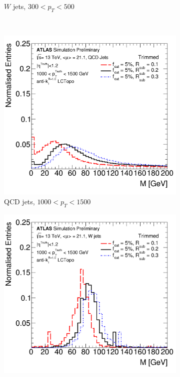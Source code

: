 \begin{figure}[htbp!]
\begin{subfigure}[b]{0.4\textwidth}
        \caption{$W$ jets, $300 < p_{T} < 500$ \GeV}
        \label{fig:obj_trim_w_lowpt}
    \end{subfigure} \\ 
    \begin{subfigure}[b]{0.4\textwidth}
        \includegraphics[width=\textwidth]{figures/object/trim_qcd_highpt}
        \caption{QCD jets, $1000 < p_{T} < 1500$ \GeV}
        \label{fig:obj_trim_qcd_highpt}
    \end{subfigure}
    \quad \quad 
    \begin{subfigure}[b]{0.4\textwidth}
        \includegraphics[width=\textwidth]{figures/object/trim_w_highpt}

\end{subfigure}
\end{figure}
